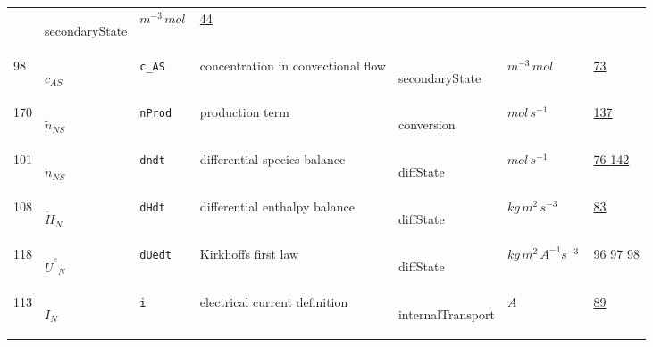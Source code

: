 \begin{longtable}{|p{1cm}|p{2.5cm}|p{4.5cm}|p{8cm}|p{3.0cm}|p{3cm}|p{1cm}|}
             & \begin{lay}secondaryState \end{lay}
             & $ m^{-3} \,mol \, $
             &                 \hyperlink{"e:44"}{ 44 }
                 \\
            98
             & \hypertarget{"v:98"}{ $ {c}{_{{A S}}} $}
             & \verb|c_AS|
             & concentration in convectional flow
             & \begin{lay}secondaryState \end{lay}
             & $ m^{-3} \,mol \, $
             &                 \hyperlink{"e:73"}{ 73 }
                 \\
            170
             & \hypertarget{"v:170"}{ $ {{\tilde n}}{_{{N S}}} $}
             & \verb|nProd|
             & production term
             & \begin{lay}conversion \end{lay}
             & $ mol \,s^{-1} \, $
             &                 \hyperlink{"e:137"}{ 137 }
                 \\
            101
             & \hypertarget{"v:101"}{ $ {\dot{n}}{_{{N S}}} $}
             & \verb|dndt|
             & differential species balance
             & \begin{lay}diffState \end{lay}
             & $ mol \,s^{-1} \, $
             &                 \hyperlink{"e:76"}{ 76 }
                                 \hyperlink{"e:142"}{ 142 }
                 \\
            108
             & \hypertarget{"v:108"}{ $ {{\dot{H}}}{_{N}} $}
             & \verb|dHdt|
             & differential enthalpy balance
             & \begin{lay}diffState \end{lay}
             & $ kg \,m^{2} \,s^{-3} \, $
             &                 \hyperlink{"e:83"}{ 83 }
                 \\
            118
             & \hypertarget{"v:118"}{ $ {{\dot{U}^e}}{_{N}} $}
             & \verb|dUedt|
             & Kirkhoffs first law
             & \begin{lay}diffState \end{lay}
             & $ kg \,m^{2} \,A^{-1} s^{-3} \, $
             &                 \hyperlink{"e:96"}{ 96 }
                                 \hyperlink{"e:97"}{ 97 }
                                 \hyperlink{"e:98"}{ 98 }
                 \\
            113
             & \hypertarget{"v:113"}{ $ {I}{_{N}} $}
             & \verb|i|
             & electrical current definition
             & \begin{lay}internalTransport \end{lay}
             & $ A \, $
             &                 \hyperlink{"e:89"}{ 89 }
                 \\
    \end{longtable}